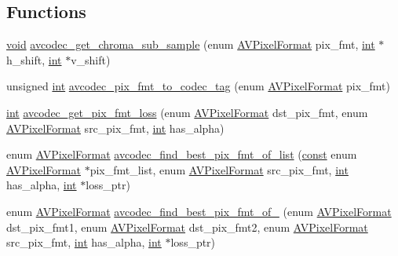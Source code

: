 \subsection*{Functions}
\begin{DoxyCompactItemize}
\item 
\hyperlink{sound_8c_ae35f5844602719cf66324f4de2a658b3}{void} \hyperlink{group__lavc__misc__pixfmt_ga8734c0195b87efe1a060ca101505c7b8}{avcodec\+\_\+get\+\_\+chroma\+\_\+sub\+\_\+sample} (enum \hyperlink{pixfmt_8h_a9a8e335cf3be472042bc9f0cf80cd4c5}{A\+V\+Pixel\+Format} pix\+\_\+fmt, \hyperlink{xmltok_8h_a5a0d4a5641ce434f1d23533f2b2e6653}{int} $\ast$h\+\_\+shift, \hyperlink{xmltok_8h_a5a0d4a5641ce434f1d23533f2b2e6653}{int} $\ast$v\+\_\+shift)
\item 
unsigned \hyperlink{xmltok_8h_a5a0d4a5641ce434f1d23533f2b2e6653}{int} \hyperlink{group__lavc__misc__pixfmt_ga9bb07f91a7c87cba19a44ebdcf5bde63}{avcodec\+\_\+pix\+\_\+fmt\+\_\+to\+\_\+codec\+\_\+tag} (enum \hyperlink{pixfmt_8h_a9a8e335cf3be472042bc9f0cf80cd4c5}{A\+V\+Pixel\+Format} pix\+\_\+fmt)
\item 
\hyperlink{xmltok_8h_a5a0d4a5641ce434f1d23533f2b2e6653}{int} \hyperlink{group__lavc__misc__pixfmt_ga838136cb54100d6afcb2f7e0377566ff}{avcodec\+\_\+get\+\_\+pix\+\_\+fmt\+\_\+loss} (enum \hyperlink{pixfmt_8h_a9a8e335cf3be472042bc9f0cf80cd4c5}{A\+V\+Pixel\+Format} dst\+\_\+pix\+\_\+fmt, enum \hyperlink{pixfmt_8h_a9a8e335cf3be472042bc9f0cf80cd4c5}{A\+V\+Pixel\+Format} src\+\_\+pix\+\_\+fmt, \hyperlink{xmltok_8h_a5a0d4a5641ce434f1d23533f2b2e6653}{int} has\+\_\+alpha)
\item 
enum \hyperlink{pixfmt_8h_a9a8e335cf3be472042bc9f0cf80cd4c5}{A\+V\+Pixel\+Format} \hyperlink{group__lavc__misc__pixfmt_ga9e74b43a3433ccfe836814f0a6371aa0}{avcodec\+\_\+find\+\_\+best\+\_\+pix\+\_\+fmt\+\_\+of\+\_\+list} (\hyperlink{getopt1_8c_a2c212835823e3c54a8ab6d95c652660e}{const} enum \hyperlink{pixfmt_8h_a9a8e335cf3be472042bc9f0cf80cd4c5}{A\+V\+Pixel\+Format} $\ast$pix\+\_\+fmt\+\_\+list, enum \hyperlink{pixfmt_8h_a9a8e335cf3be472042bc9f0cf80cd4c5}{A\+V\+Pixel\+Format} src\+\_\+pix\+\_\+fmt, \hyperlink{xmltok_8h_a5a0d4a5641ce434f1d23533f2b2e6653}{int} has\+\_\+alpha, \hyperlink{xmltok_8h_a5a0d4a5641ce434f1d23533f2b2e6653}{int} $\ast$loss\+\_\+ptr)
\item 
enum \hyperlink{pixfmt_8h_a9a8e335cf3be472042bc9f0cf80cd4c5}{A\+V\+Pixel\+Format} \hyperlink{group__lavc__misc__pixfmt_ga209703f647b87bd3f35ed97eb534fd21}{avcodec\+\_\+find\+\_\+best\+\_\+pix\+\_\+fmt\+\_\+of\+\_} (enum \hyperlink{pixfmt_8h_a9a8e335cf3be472042bc9f0cf80cd4c5}{A\+V\+Pixel\+Format} dst\+\_\+pix\+\_\+fmt1, enum \hyperlink{pixfmt_8h_a9a8e335cf3be472042bc9f0cf80cd4c5}{A\+V\+Pixel\+Format} dst\+\_\+pix\+\_\+fmt2, enum \hyperlink{pixfmt_8h_a9a8e335cf3be472042bc9f0cf80cd4c5}{A\+V\+Pixel\+Format} src\+\_\+pix\+\_\+fmt, \hyperlink{xmltok_8h_a5a0d4a5641ce434f1d23533f2b2e6653}{int} has\+\_\+alpha, \hyperlink{xmltok_8h_a5a0d4a5641ce434f1d23533f2b2e6653}{int} $\ast$loss\+\_\+ptr)

\end{DoxyCompactItemize}
